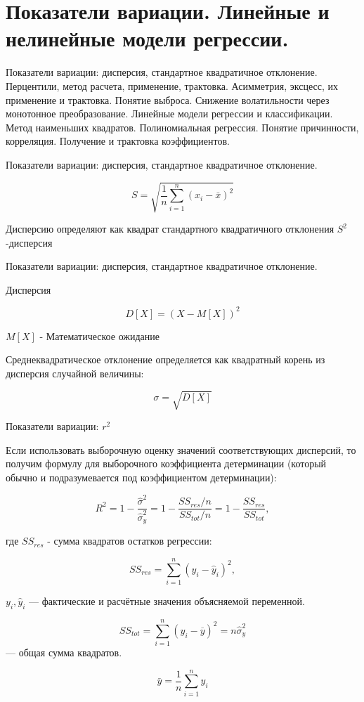 \documentclass{beamer}
\begin{document}
\section{Показатели вариации. Линейные и нелинейные модели регрессии.}


\begin{frame}
Показатели вариации: дисперсия, стандартное квадратичное отклонение.
Перцентили, метод расчета, применение, трактовка.
Асимметрия, эксцесс, их применение и трактовка. Понятие выброса. 
Снижение волатильности через монотонное преобразование.
 Линейные модели регрессии и классификации.
  Метод наименьших квадратов. 
  Полиномиальная регрессия. 
  Понятие причинности, корреляция. 
  Получение и трактовка коэффициентов.
\end{frame}


\begin{frame}{Показатели вариации: дисперсия, стандартное квадратичное отклонение.}

$$S=\sqrt{\frac{1}{n}\sum_{i=1}^n\left(x_i-\bar{x}\right)^2}$$

Дисперсию определяют как квадрат стандартного квадратичного отклонения
 $S^2$ -дисперсия

\end{frame}


\begin{frame}{Показатели вариации: дисперсия, стандартное квадратичное отклонение.}


Дисперсия 

$$D[X] = (X -M[X])^2$$
 
 $M[X]$ - Математическое ожидание
 
 
 Среднеквадратическое отклонение определяется как квадратный корень из дисперсия случайной величины:
 
 $$\sigma = \sqrt{D[X]}$$

\end{frame}

\begin{frame}{Показатели вариации: $r^2$}

 Если использовать выборочную оценку значений соответствующих дисперсий, то получим формулу для выборочного коэффициента детерминации (который обычно и подразумевается под коэффициентом детерминации):

$$R^2 =1-\frac {\hat{\sigma}^2}{\hat{\sigma}^2_y}=1-\frac {SS_{res}/n}{SS_{tot}/n}=1-\frac {SS_{res}} {SS_{tot}},$$

где $SS_{res}$ -   сумма квадратов остатков регрессии:

$$SS_{res}=\sum^n_{i=1} (y_i-\hat y_i)^2, $$ 

$y_i,\hat y_i$ — фактические и расчётные значения объясняемой переменной.

$$SS_{tot}=\sum^n_{i=1} (y_i-\overline y)^2=n \hat \sigma^2_y$$ — общая сумма квадратов.

$$\bar{y}=\frac{1}{n}\sum_{i=1}^n y_i$$

\end{frame}
\end{document}
